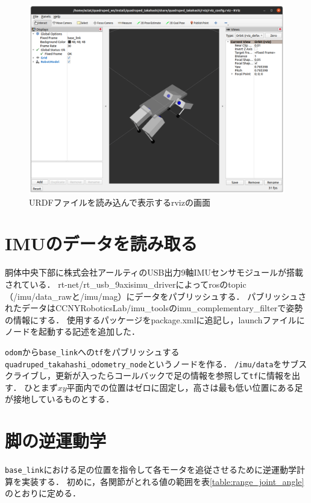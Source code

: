 \documentclass[a4paper]{jlreq}
\begin{document}
  \begin{figure}[htb]
    \centering
    \includegraphics[width=15cm]{urdf_rviz_screen.png}
    \caption{URDFファイルを読み込んで表示するrvizの画面}
    \label{fig:urdf_rviz_screen}
  \end{figure}

  \section{IMUのデータを読み取る}

  胴体中央下部に株式会社アールティのUSB出力9軸IMUセンサモジュールが搭載されている．
  rt-net/rt\_usb\_9axisimu\_driverによってrosのtopic（/imu/data\_rawと/imu/mag）にデータをパブリッシュする．
  パブリッシュされたデータはCCNYRoboticsLab/imu\_toolsのimu\_complementary\_filterで姿勢の情報にする．
  使用するパッケージをpackage.xmlに追記し，launchファイルにノードを起動する記述を追加した．

  \texttt{odom}から\texttt{base\_link}への\texttt{tf}をパブリッシュする
  \texttt{quadruped\_takahashi\_odometry\_node}というノードを作る．
  \texttt{/imu/data}をサブスクライブし，更新が入ったらコールバックで足の情報を参照して\texttt{tf}に情報を出す．
  ひとまず$xy$平面内での位置はゼロに固定し，高さは最も低い位置にある足が接地しているものとする．

  \section{脚の逆運動学}

  \texttt{base\_link}における足の位置を指令して各モータを追従させるために逆運動学計算を実装する．
  初めに，各関節がとれる値の範囲を表\ref{table:range_joint_angle}のとおりに定める．
\end{document}
